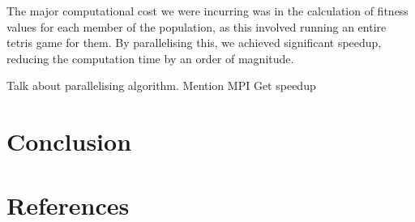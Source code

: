 \documentclass{article}
\begin{document}
The major computational cost we were incurring was in the calculation of
fitness values for each member of the population, as this involved running an
entire tetris game for them. By parallelising this, we achieved significant
speedup, reducing the computation time by an order of magnitude.

Talk about parallelising algorithm. Mention MPI
Get speedup

\section{Conclusion}


\section{References}
\end{document}
